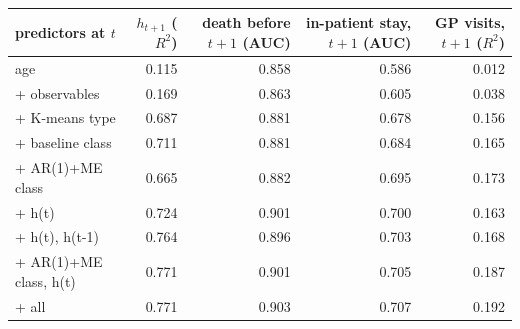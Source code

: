 \begin{tabular}{lrrrr}
\toprule
predictors at $t$ & $h_{t+1}$ ($R^2$) & death before $t+1$ (AUC) & in-patient stay, $t+1$ (AUC) & GP visits, $t+1$ ($R^2$) \\
\midrule
age & 0.115 & 0.858 & 0.586 & 0.012 \\
+ observables & 0.169 & 0.863 & 0.605 & 0.038 \\
+ K-means type & 0.687 & 0.881 & 0.678 & 0.156 \\
+ baseline class & 0.711 & 0.881 & 0.684 & 0.165 \\
+ AR(1)+ME class & 0.665 & 0.882 & 0.695 & 0.173 \\
+ h(t) & 0.724 & 0.901 & 0.700 & 0.163 \\
+ h(t), h(t-1) & 0.764 & 0.896 & 0.703 & 0.168 \\
+ AR(1)+ME class, h(t) & 0.771 & 0.901 & 0.705 & 0.187 \\
+ all & 0.771 & 0.903 & 0.707 & 0.192 \\
\bottomrule
\end{tabular}
